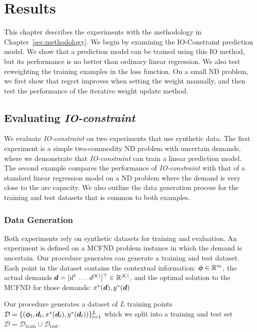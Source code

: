 \chapter{Results} \label{sec:evaluation}

This chapter describes the experiments with the methodology in Chapter~\ref{sec:methodology}. We begin by examining the IO-Constraint prediction model. We show that a prediction model can be trained using this IO method, but its performance is no better than ordinary linear regression. We also test reweighting the training examples in the loss function. On a small ND problem, we first show that regret improves when setting the weight manually, and then test the performance of the iterative weight update method.

\section{Evaluating \textit{IO-constraint}} \label{sec:eval:io-constraint}

We evaluate \textit{IO-constraint} on two experiments that use synthetic data. The first experiment is a simple two-commodity ND problem with uncertain demands, where we demonstrate that \textit{IO-constraint} can train a linear prediction model. The second example compares the performance of \textit{IO-constraint} with that of a standard linear regression model on a ND problem where the demand is very close to the arc capacity. We also outline the data generation process for the training and test datasets that is common to both examples.

\subsection{Data Generation}

Both experiments rely on synthetic datasets for training and evaluation.  An experiment is defined on a MCFND problem instance in which the demand is uncertain. Our procedure generates can generate a training and test dataset. Each point in the dataset contains the contextual information: ${\bm{\phi}} \in \mathbb{R}^m$, the actual demands ${\bm{d}} = [d^1\, \ldots \, d^{|\mathcal{K}|}]^\top \in \mathbb{R}^{|\mathcal{K}|}$, and the optimal solution to the MCFND for those demands: $x^*({\bm{d}}), y^*({\bm{d}})$

Our procedure generates a dataset of $L$ training points $\mathcal{D} = \{({\bm{\phi}}_l, {\bm{d}}_l, x^*({\bm{d}}_l), y^*({\bm{d}}_l))\}^L_{l=1}$ which we split into a training and test set $\mathcal{D} = \mathcal{D}_\text{train} \cup \mathcal{D}_\text{test}$.

